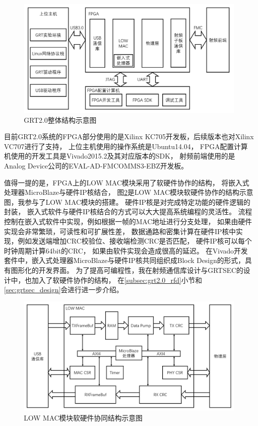 			\begin{figure}
				\centering
				\includegraphics[width=1.0\textwidth]{img/GRT_overview.png}
				\caption{GRT2.0整体结构示意图}
				\label{fig:grt_overview}
			\end{figure}
		目前GRT2.0系统的FPGA部分使用的是Xilinx KC705开发板，后续版本也对Xilinx VC707进行了支持，
		上位主机使用的操作系统是Ubuntu14.04，
		FPGA配置计算机使用的开发工具是Vivado2015.2及其对应版本的SDK，
		射频前端使用的是Analog Device公司的EVAL-AD-FMCOMMS3-EBZ开发板\cite{fmcomms3}。

		值得一提的是，FPGA上的LOW MAC模块采用了软硬件协作的结构，
		将嵌入式处理器MicroBlaze\cite{microblaze}与硬件IP核\cite{xilinxip}结合，
		图\ref{fig:grt_lowmac}是LOW MAC模块软硬件协作的结构示意图，我参与了LOW MAC模块的搭建。
		硬件IP核是对完成特定功能的硬件逻辑的封装，
		嵌入式软件与硬件IP核结合的方式可以大大提高系统编程的灵活性。
		流程控制在嵌入式软件中实现，例如根据一帧的MAC地址进行分支处理，
		如果由硬件实现会非常繁琐，可读性和可扩展性差，
		数据通路和密集计算在硬件IP核中实现，例如发送端增加CRC校验位、接收端检测CRC是否匹配，
		硬件IP核可以每个时钟周期计算64bit的CRC，
		如果由软件实现会造成很高的延迟。
		在Vivado开发套件中，嵌入式处理器MicroBlaze与硬件IP核共同组织成Block Design\cite{xilinxblockdesign}的形式，具有图形化的开发界面。
		为了提高可编程性，我在射频通信库设计与GRTSEC的设计中，也加入了软硬件协作的结构，
		在\ref{subsec:grt2.0_rfd}小节和\ref{sec:grtsec_design}会进行进一步介绍。

			\begin{figure}
				\centering
				\includegraphics[width=1.0\textwidth]{img/GRT_lowmac.png}
				\caption{LOW MAC模块软硬件协同结构示意图}
				\label{fig:grt_lowmac}
			\end{figure}

